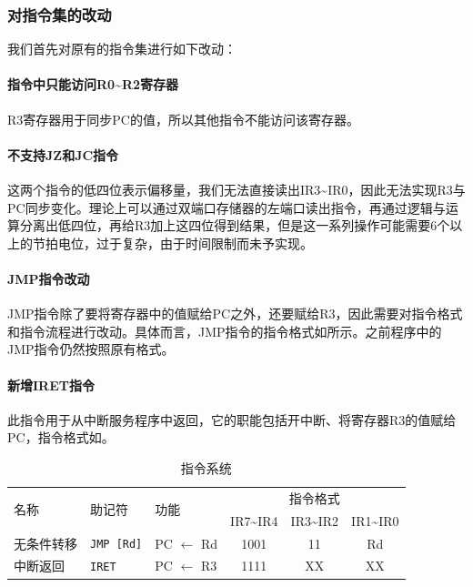 \documentclass[lang=cn,11pt,a4paper,cite=authornum]{paper}
\begin{document}
\subsubsection{对指令集的改动}

我们首先对原有的指令集进行如下改动：

\paragraph{指令中只能访问R0\textasciitilde R2寄存器} R3寄存器用于同步PC的值，所以其他指令不能访问该寄存器。

\paragraph{不支持JZ和JC指令} 这两个指令的低四位表示偏移量，我们无法直接读出IR3\textasciitilde IR0，因此无法实现R3与PC同步变化。理论上可以通过双端口存储器的左端口读出指令，再通过逻辑与运算分离出低四位，再给R3加上这四位得到结果，但是这一系列操作可能需要6个以上的节拍电位，过于复杂，由于时间限制而未予实现。

\paragraph{JMP指令改动} JMP指令除了要将寄存器中的值赋给PC之外，还要赋给R3，因此需要对指令格式和指令流程进行改动。具体而言，JMP指令的指令格式如所示。之前程序中的JMP指令仍然按照原有格式。

\paragraph{新增IRET指令} 此指令用于从中断服务程序中返回，它的职能包括开中断、将寄存器R3的值赋给PC，指令格式如。

\begin{table}[!htbp]
    \centering
    \caption{指令系统\label{tab:jmpcommand}}
    \begin{tabular}{|l|l|l|c|c|c|}
        \hline
        \multirow{2}{*}{名称} & \multirow{2}{*}{助记符} & \multirow{2}{*}{功能} & \multicolumn{3}{c|}{指令格式} \\ \cline{4-6}
        & & & IR7\textasciitilde IR4 & IR3\textasciitilde IR2 & IR1\textasciitilde IR0 \\ \hline
        无条件转移 & \texttt{JMP [Rd]} & PC $\leftarrow$ Rd & 1001 & 11 & Rd \\ \hline
        中断返回 & \texttt{IRET} & PC $\leftarrow$ R3 & 1111 & XX & XX \\ \hline
    \end{tabular}
\end{table}
\end{document}

